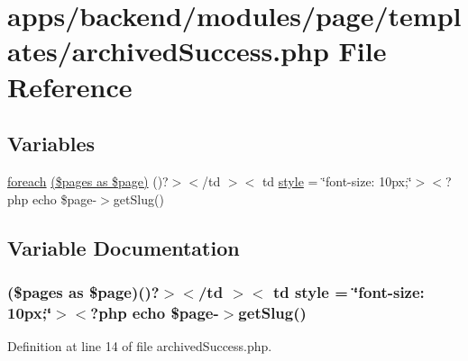 \hypertarget{archived_success_8php}{\section{apps/backend/modules/page/templates/archived\-Success.php File Reference}
\label{archived_success_8php}
}
\subsection*{Variables}
\begin{DoxyCompactItemize}
\item 
\hyperlink{presse_2modules_2news_2templates_2index_success_8php_abc56db52b2e9a59bcd5c9e45ac5cb332}{foreach} \hyperlink{archived_success_8php_a5c8a96efea656a76f908c39abb467bf4}{(\$pages as \$page)} ()?$>$$<$/td $>$$<$ td \hyperlink{backend_2modules_2news_2templates_2__form_8php_a8ba9b58991c02462588258e164fe3f84}{style} = \char`\"{}font-\/size\-: 10px;\char`\"{}$>$$<$?php echo \$page-\/$>$get\-Slug()
\end{DoxyCompactItemize}


\subsection{Variable Documentation}
\hypertarget{archived_success_8php_a5c8a96efea656a76f908c39abb467bf4}{
\subsubsection[{(\$pages as \$page)}]{ (\$pages as \$page)()?$>$$<$/td $>$$<$ td {\bf style} = \char`\"{}font-\/size\-: 10px;\char`\"{}$>$$<$?php echo \$page-\/$>$get\-Slug()}}\label{archived_success_8php_a5c8a96efea656a76f908c39abb467bf4}


Definition at line 14 of file archived\-Success.\-php.

